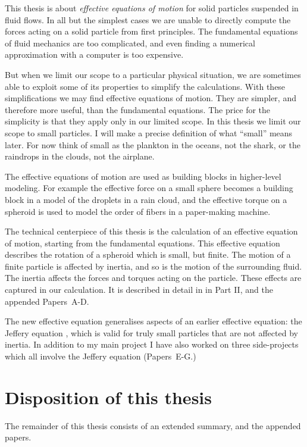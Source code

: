 \documentclass[thesis.tex]{subfiles}
\begin{document}
This thesis is about \emph{effective equations of motion} for solid particles suspended in fluid flows. In all but the simplest cases we are unable to directly compute the forces acting on a solid particle from first principles. The fundamental equations of fluid mechanics are too complicated, and even finding a numerical approximation with a computer is too expensive.

But when we limit our scope to a particular physical situation, we are sometimes able to exploit some of its properties to simplify the calculations. With these simplifications we may find effective equations of motion. They are simpler, and therefore more useful, than the fundamental equations. The price for the simplicity is that they apply only in our limited scope. In this thesis we limit our scope to small particles. I will make a precise definition of what ``small'' means later. For now think of small as the plankton in the oceans, not the shark, or the raindrops in the clouds, not the airplane.

The effective equations of motion are used as building blocks in higher-level modeling. For example the effective force on a small sphere becomes a building block in a model of the droplets in a rain cloud, and the effective torque on a spheroid is used to model the order of fibers in a paper-making machine.

The technical centerpiece of this thesis is the calculation of an effective equation of motion, starting from the fundamental equations. This effective equation describes the rotation of a spheroid which is small, but finite. The motion of a finite particle is affected by inertia, and so is the motion of the surrounding fluid. The inertia affects the forces and torques acting on the particle. These effects are captured in our calculation. It is described in detail in  in Part II, and the appended Papers~A-D.

The new effective equation generalises aspects of an earlier effective equation: the Jeffery equation \cite{jeffery1922}, which is valid for truly small particles that are not affected by inertia. In addition to my main project I have also worked on three side-projects which all involve the Jeffery equation (Papers~E-G.)

\section*{Disposition of this thesis}

The remainder of this thesis consists of an extended summary, and the appended papers.
\end{document}
